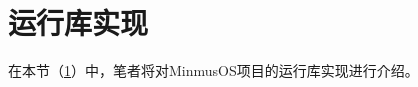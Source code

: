 \section{运行库实现}\label{sec:RuntimeLibraryImplementation}

在本节（\cref{sec:RuntimeLibraryImplementation}）中，笔者将对MinmusOS项目的运行库实现进行介绍。